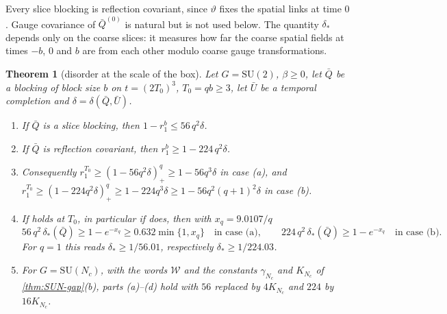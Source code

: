 \documentclass[11pt,a4paper]{amsart}
\newtheorem{theorem}{Theorem}[section]
\theoremstyle{definition}
\theoremstyle{remark}
\numberwithin{equation}{section}
\newcommand{\SU}{\mathrm{SU}}              %
\newcommand{\cube}[1]{(2#1)^3}             %
\newcommand{\Mcirc}{\text{\upshape(M$^{\circ}$)}}   %
\newcommand{\Bcirc}{\text{\upshape(B$^{\circ}$)}}   %
\begin{document}
Every slice blocking is reflection covariant, since $\vartheta$ fixes the spatial links at time $0$. Gauge covariance of $\bar Q^{(0)}$ is natural but is not used below. The quantity $\delta_*$ depends only on the coarse slices: it measures how far the coarse spatial fields at times $-b$, $0$ and $b$ are from each other modulo coarse gauge transformations.

\begin{theorem}[disorder at the scale of the box]\label{thm:box-disorder}
Let $G=\SU(2)$, $\beta\ge0$, let $\bar Q$ be a blocking of block size $b$ on $t=\cube{T_0}$, $T_0=qb\ge3$, let $\bar U$ be a temporal completion and $\delta=\delta(\bar Q,\bar U)$.
\begin{enumerate}[label=\textup{(\alph*)},leftmargin=*]
\item If $\bar Q$ is a slice blocking, then $1-r_1^b\le56\,q^2\delta$.
\item If $\bar Q$ is reflection covariant, then $r_1^b\ge1-224\,q^2\delta$.
\item Consequently $r_1^{T_0}\ge(1-56q^2\delta)_+^q\ge1-56q^3\delta$ in case \textup{(a)}, and $r_1^{T_0}\ge(1-224q^2\delta)_+^q\ge1-224q^3\delta\ge1-56q^2(q+1)^2\delta$ in case \textup{(b)}.
\item If \Bcirc{} holds at $T_0$, in particular if \Mcirc{} does, then with $x_q=9.0107/q$
\[
56\,q^2\,\delta_*(\bar Q)\ge1-e^{-x_q}\ge0.632\min\{1,x_q\}\quad\text{in case (a)},\qquad 224\,q^2\,\delta_*(\bar Q)\ge1-e^{-x_q}\quad\text{in case (b)}.
\]
For $q=1$ this reads $\delta_*\ge1/56.01$, respectively $\delta_*\ge1/224.03$.
\item For $G=\SU(N_c)$, with the words $\mathcal W$ and the constants $\gamma_{N_c}$ and $K_{N_c}$ of \cref{thm:SUN-gap}\textup{(b)}, parts \textup{(a)--(d)} hold with $56$ replaced by $4K_{N_c}$ and $224$ by $16K_{N_c}$.
\end{enumerate}
\end{theorem}
\end{document}
